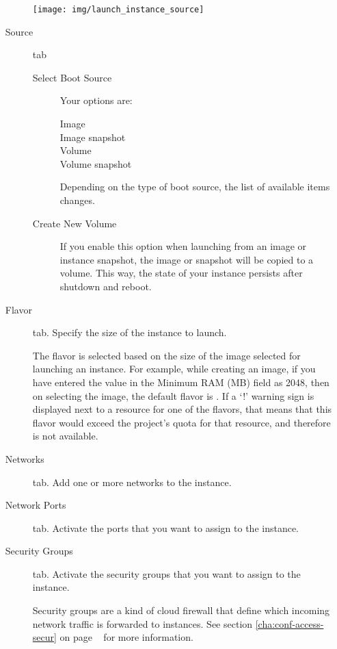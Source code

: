 \begin{enumerate}
\begin{description}
    \begin{center}
      \texttt{[image: img/launch\_instance\_source]}
    \end{center}
  \item[Source] tab
  \begin{description}
  \item[Select Boot Source] Your options are:
    \begin{description}
    \item[Image]
    \item[Image snapshot]
    \item[Volume]
    \item[Volume snapshot]
    \end{description}
    Depending on the type of boot source, the list of available items
    changes.

  \item[Create New Volume] If you enable this option when launching
    from an image or instance snapshot, the image or snapshot will be
    copied to a volume.  This way, the state of your instance persists
    after shutdown and reboot.
  \end{description}

\item[Flavor] tab. Specify the size of the instance to launch.

   The flavor is selected based on the size of the image
  selected for launching an instance. For example, while creating an
  image, if you have entered the value in the Minimum RAM (MB) field
  as 2048, then on selecting the image, the default flavor is
  .  If a `!' warning sign is displayed next to a
  resource for one of the flavors, that means that this flavor would
  exceed the project's quota for that resource, and therefore is not
  available.

\item[Networks] tab. Add one or more networks to the instance.

\item[Network Ports] tab. Activate the ports that you want to assign to
  the instance.
\item[Security Groups] tab. Activate the security groups that you want
  to assign to the instance.

  Security groups are a kind of cloud firewall that define which
  incoming network traffic is forwarded to instances.  See section
  \ref{cha:conf-access-secur} on page ~\pageref{sec:security-groups}
  for more information.


\end{description}
\end{enumerate}
